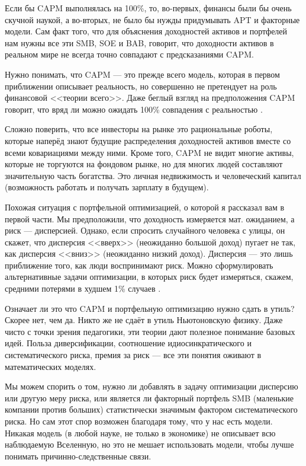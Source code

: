 Если бы CAPM выполнялась на 100\%, то, во-первых, финансы были бы очень скучной
наукой, а во-вторых, не было бы нужды придумывать APT и факторные модели. Сам 
факт того, что для объяснения доходностей активов и портфелей нам нужны все эти 
SMB, SOE и BAB, говорит, что доходности активов в реальном мире не всегда точно 
совпадают с предсказаниями CAPM.

Нужно понимать, что CAPM --- это прежде всего модель, которая в первом 
приближении описывает реальность, но совершенно не претендует на роль 
финансовой <<теории всего>>. Даже беглый взгляд на предположения CAPM говорит, 
что вряд ли можно ожидать 100\% совпадения с реальностью
\cite[ch.~14.2]{welch}.

Сложно поверить, что все инвесторы на рынке это рациональные роботы, которые 
наперёд знают будущие распределения доходностей активов вместе со всеми 
ковариациями между ними. Кроме того, CAPM не видит многие активы, которые
не торгуются на фондовом рынке, но для многих людей составляют значительную 
часть богатства. Это личная недвижимость и человеческий капитал (возможность 
работать и получать зарплату в будущем).

Похожая ситуация с портфельной оптимизацией, о которой я рассказал вам в первой 
части. Мы предположили, что доходность измеряется мат. ожиданием, а риск --- 
дисперсией. Однако, если спросить случайного человека с улицы, он скажет, что 
дисперсия <<вверх>> (неожиданно большой доход) пугает не так, как дисперсия 
<<вниз>> (неожиданно низкий доход). Дисперсия --- это лишь приближение того, 
как люди воспринимают риск. Можно сформулировать альтернативные задачи 
оптимизации, в которых риск будет измеряться, скажем, средними потерями в 
худшем 1\% случаев \cite{krokhmal2002portfolio}.

Означает ли это что CAPM и портфельную оптимизацию нужно сдать в утиль? Скорее 
нет, чем да. Никто же не сдаёт в утиль Ньютоновскую физику. Даже чисто с точки
зрения педагогики, эти теории дают полезное понимание базовых идей. Польза 
диверсификации, соотношение идиосинкратического и систематического риска, 
премия за риск --- все эти понятия оживают в математических моделях.

Мы можем спорить о том, нужно ли добавлять в задачу оптимизации дисперсию или 
другую меру риска, или является ли факторный портфель SMB (маленькие компании 
против больших) статистически значимым фактором систематического риска. Но сам 
этот спор возможен благодаря тому, что у нас есть модели. Никакая модель (в 
любой науке, не только в экономике) не описывает всю наблюдаемую Вселенную, но 
это не мешает использовать модели, чтобы лучше понимать причинно-следственные 
связи.

